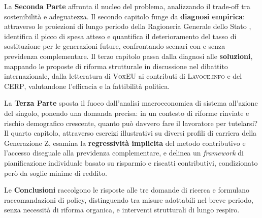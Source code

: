La \textbf{Seconda Parte} affronta il nucleo del problema, analizzando il trade-off
tra sostenibilità e adeguatezza. Il secondo capitolo funge da \textbf{diagnosi
empirica}: attraverso le proiezioni di lungo periodo della Ragioneria Generale dello
Stato \cite{MEF_RGS2025}, identifica il picco di spesa atteso e quantifica il
deterioramento del tasso di sostituzione per le generazioni future, confrontando
scenari con e senza previdenza complementare. Il terzo capitolo passa dalla diagnosi
alle \textbf{soluzioni}, mappando le proposte di riforma strutturale in discussione
nel dibattito internazionale, dalla letteratura di \textsc{VoxEU} ai contributi di
\textsc{Lavoce.info} e del \textsc{CERP}, valutandone l'efficacia e la fattibilità
politica.

La \textbf{Terza Parte} sposta il fuoco dall'analisi macroeconomica di sistema
all'azione del singolo, ponendo una domanda precisa: in un contesto di riforme
rinviate e rischio demografico crescente, quanto può davvero fare il lavoratore
per tutelarsi? Il quarto capitolo, attraverso esercizi illustrativi su diversi profili di
carriera della Generazione Z, esamina la \textbf{regressività implicita} del
metodo contributivo e l'accesso diseguale alla previdenza complementare, e
delinea un \textit{framework} di pianificazione
individuale basato su risparmio e riscatti contributivi, condizionato però da
soglie minime di reddito.

Le \textbf{Conclusioni} raccolgono le risposte alle tre domande di ricerca e
formulano raccomandazioni di policy, distinguendo tra misure adottabili nel breve
periodo, senza necessità di riforma organica, e interventi strutturali di lungo
respiro.